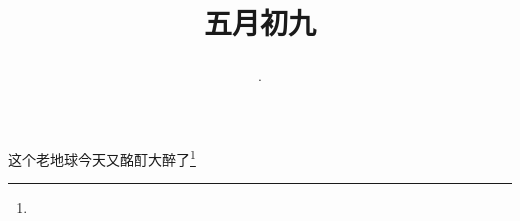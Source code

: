 \title{\date[d=14,m=6,y=2024][year:cn-y,年,month:cn,day:cn,日,·,weekday]·五月初九 }
这个老地球今天又酩酊大醉了\footnote{ }

